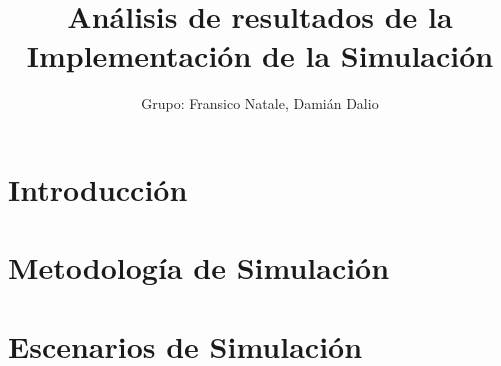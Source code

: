\documentclass{article}
\title{Análisis de resultados de la Implementación de la Simulación}
\author{Grupo: Fransico Natale, Damián Dalio}
\date{}
\begin{document}
\maketitle

\tableofcontents
\clearpage

\section{Introducción}




\section{Metodología de Simulación}



\clearpage
\section{Escenarios de Simulación}







\clearpage



% 

% 

% 

% 
% 
\end{document}
